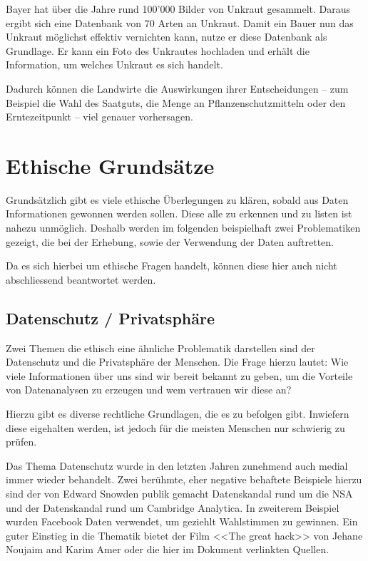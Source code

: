 Bayer hat über die Jahre rund 100'000 Bilder von Unkraut gesammelt. Daraus ergibt sich eine Datenbank von 70 Arten an Unkraut.
Damit ein Bauer nun das Unkraut möglichst effektiv vernichten kann, nutze er diese Datenbank als Grundlage. Er kann ein Foto des Unkrautes hochladen und erhält die Information, um welches Unkraut es sich handelt.

Dadurch können die Landwirte die Auswirkungen ihrer Entscheidungen – zum Beispiel die Wahl des Saatguts, die Menge an Pflanzenschutzmitteln oder den Erntezeitpunkt – viel genauer vorhersagen.\cite{bayer}

\clearpage
\section{Ethische Grundsätze}
\label{sec:ethics}
Grundsätzlich gibt es viele ethische Überlegungen zu klären, sobald aus Daten Informationen gewonnen werden sollen. Diese alle zu erkennen und zu listen ist nahezu unmöglich. Deshalb werden im folgenden beispielhaft zwei Problematiken gezeigt, die bei der Erhebung, sowie der Verwendung der Daten auftretten. \cite{ethics}

Da es sich hierbei um ethische Fragen handelt, können diese hier auch nicht abschliessend beantwortet werden.

\subsection{Datenschutz / Privatsphäre}
Zwei Themen die ethisch eine ähnliche Problematik darstellen sind der Datenschutz und die Privatsphäre der Menschen.
Die Frage hierzu lautet: Wie viele Informationen über uns sind wir bereit bekannt zu geben, um die Vorteile von Datenanalysen zu erzeugen und wem vertrauen wir diese an?

Hierzu gibt es diverse rechtliche Grundlagen, die es zu befolgen gibt. Inwiefern diese eigehalten werden, ist jedoch für die meisten Menschen nur schwierig zu prüfen. 

Das Thema Datenschutz wurde in den letzten Jahren zunehmend auch medial immer wieder behandelt.
Zwei berühmte, eher negative behaftete Beispiele hierzu sind der von Edward Snowden publik gemacht Datenskandal rund um die NSA und der Datenskandal rund um Cambridge Analytica. In zweiterem Beispiel wurden Facebook Daten verwendet, um geziehlt Wahlstimmen zu gewinnen.
Ein guter Einstieg in die Thematik bietet der Film <<The great hack>> von Jehane Noujaim and Karim Amer oder die hier im Dokument verlinkten Quellen. \cite{nsa} \cite{ca}

